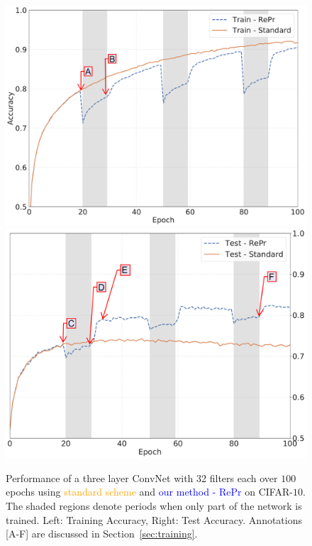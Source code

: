 \begin{figure}[H]
\center
   \includegraphics[width=0.47\linewidth]{figures/repr/RePr_Train.pdf}
   \includegraphics[width=0.45\linewidth]{figures/repr/RePr_Test.pdf}
   \caption{Performance of a three layer ConvNet with 32 filters each over $100$ epochs using \textcolor{orange}{standard scheme} and \textcolor{blue}{our method - RePr} on CIFAR-$10$. The shaded regions denote periods when only part of the network is trained. 
   Left: Training Accuracy, Right: Test Accuracy. Annotations [A-F] are discussed in Section~\ref{sec:training}.}
   \label{fig:REPR}
\end{figure}

